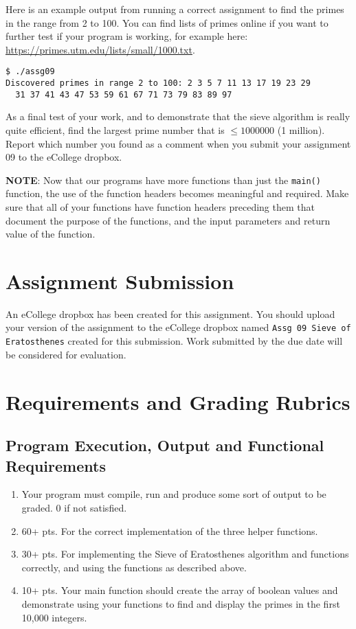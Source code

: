 \documentclass[11pt]{article}
\begin{document}
Here is an example output from running a correct assignment to find the
primes in the range from 2 to 100.  You can find lists of primes online
if you want to further test if your program is working, for example
here: \href{https://primes.utm.edu/lists/small/1000.txt}{https://primes.utm.edu/lists/small/1000.txt}.


\begin{verbatim}
$ ./assg09
Discovered primes in range 2 to 100: 2 3 5 7 11 13 17 19 23 29 
  31 37 41 43 47 53 59 61 67 71 73 79 83 89 97
\end{verbatim}

As a final test of your work, and to demonstrate that the sieve
algorithm is really quite efficient, find the largest prime number
that is $\le 1 000 000$ (1 million).  Report which number you found as
a comment when you submit your assignment 09 to the eCollege dropbox.

\textbf{NOTE}: Now that our programs have more functions than just the
\verb~main()~ function, the use of the function headers becomes meaningful
and required.  Make sure that all of your functions have function
headers preceding them that document the purpose of the functions, and
the input parameters and return value of the function.
\section*{Assignment Submission}
\label{sec-4}


An eCollege dropbox has been created for this assignment.  You should
upload your version of the assignment to the eCollege dropbox named
\verb~Assg 09 Sieve of Eratosthenes~ created for this submission.  Work
submitted by the due date will be considered for evaluation.
\section*{Requirements and Grading Rubrics}
\label{sec-5}
\subsection*{Program Execution, Output and Functional Requirements}
\label{sec-5-1}


\begin{enumerate}
\item Your program must compile, run and produce some sort of output to
   be graded. 0 if not satisfied.
\item 60+ pts. For the correct implementation of the three helper functions.
\item 30+ pts. For implementing the Sieve of Eratosthenes algorithm and functions
   correctly, and using the functions as described above.
\item 10+ pts. Your main function should create the array of boolean values
   and demonstrate using your functions to find and display the primes in
   the first 10,000 integers.
\end{enumerate}
\end{document}
